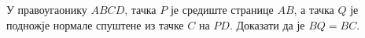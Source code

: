У правоугаонику $ABCD$, тачка $P$ је средиште странице $AB$, а тачка $Q$ је
подножје нормале спуштене из тачке $C$ на $PD$.
Доказати да је $BQ = BC$.

\solution

